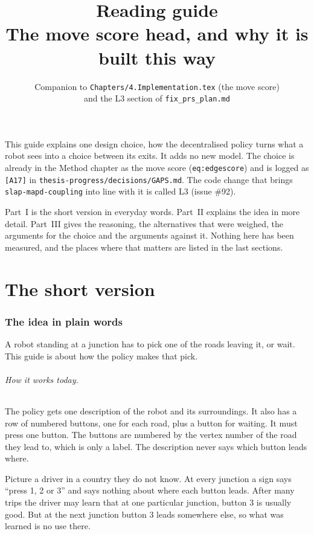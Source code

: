 \documentclass[11pt,a4paper]{article}
\title{Reading guide\\[2pt]\large The move score head, and why it is built this way}
\author{Companion to \texttt{Chapters/4.Implementation.tex} (the move score)\\and the L3 section of \texttt{fix\_prs\_plan.md}}
\date{}
\begin{document}
\maketitle

\noindent This guide explains one design choice, how the decentralised
policy turns what a robot sees into a choice between its exits. It adds no
new model. The choice is already in the Method chapter as the move score
(\texttt{eq:edgescore}) and is logged as \texttt{[A17]} in
\texttt{thesis-progress/decisions/GAPS.md}. The code change that brings
\texttt{slap-mapd-coupling} into line with it is called L3 (issue \#92).

Part~I is the short version in everyday words. Part~II explains the idea in
more detail. Part~III gives the reasoning, the alternatives that were
weighed, the arguments for the choice and the arguments against it. Nothing here has been measured, and
the places where that matters are listed in the last sections.

\tableofcontents

\part{The short version}

\section{The idea in plain words}

A robot standing at a junction has to pick one of the roads leaving it, or
wait. This guide is about how the policy makes that pick.

\paragraph{How it works today.} The policy gets one description of the robot
and its surroundings. It also has a row of numbered buttons, one for each
road, plus a button for waiting. It must press one button. The buttons are
numbered by the vertex number of the road they lead to, which is only a
label. The description never says which button leads where.

Picture a driver in a country they do not know. At every junction a sign says
``press 1, 2 or 3'' and says nothing about where each button leads. After
many trips the driver may learn that at one particular junction, button 3 is
usually good. But at the next junction button 3 leads somewhere else, so what
was learned is no use there.
\end{document}

